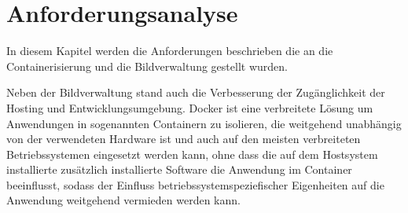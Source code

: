 \section{Anforderungsanalyse}
\label{sec:requirements}

In diesem Kapitel werden die Anforderungen beschrieben die an die Containerisierung und die Bildverwaltung gestellt wurden.

Neben der Bildverwaltung stand auch die Verbesserung der Zug\"{a}nglichkeit der Hosting und Entwicklungsumgebung. Docker ist eine verbreitete L\"{o}sung um Anwendungen in sogenannten Containern zu isolieren, die weitgehend unabh\"{a}ngig von der verwendeten Hardware ist und auch auf den meisten verbreiteten Betriebssystemen eingesetzt werden kann, ohne dass die auf dem Hostsystem installierte zus\"{a}tzlich installierte Software die Anwendung im Container beeinflusst, sodass der Einfluss betriebssystemspeziefischer Eigenheiten auf die Anwendung weitgehend vermieden werden kann.

